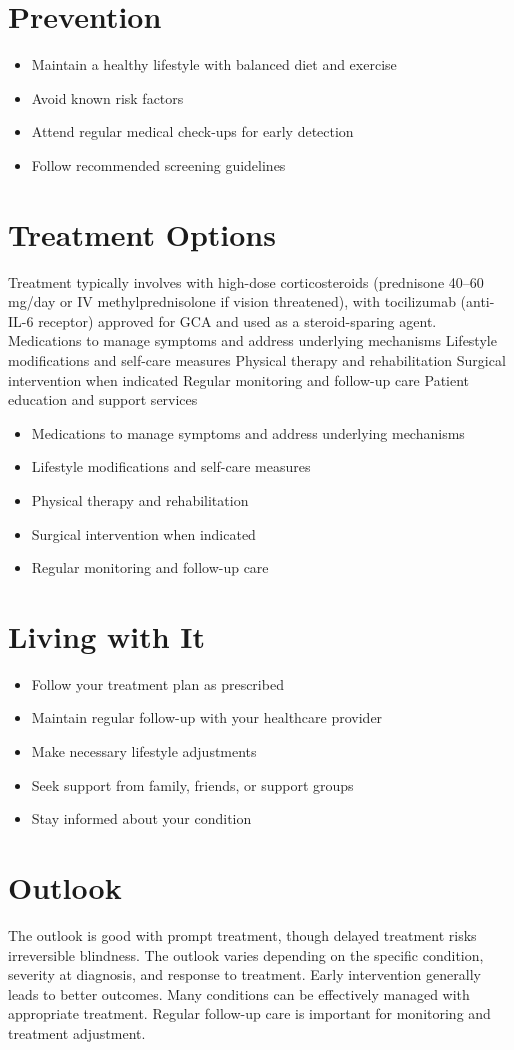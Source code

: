 \section{Prevention}
\begin{itemize}[noitemsep]
  \item Maintain a healthy lifestyle with balanced diet and exercise
  \item Avoid known risk factors
  \item Attend regular medical check-ups for early detection
  \item Follow recommended screening guidelines
\end{itemize}
\section{Treatment Options}
Treatment typically involves with high-dose corticosteroids (prednisone 40--60 mg/day or IV methylprednisolone if vision threatened), with tocilizumab (anti-IL-6 receptor) approved for GCA and used as a steroid-sparing agent. Medications to manage symptoms and address underlying mechanisms Lifestyle modifications and self-care measures Physical therapy and rehabilitation Surgical intervention when indicated Regular monitoring and follow-up care Patient education and support services

\begin{itemize}[noitemsep]
  \item Medications to manage symptoms and address underlying mechanisms
  \item Lifestyle modifications and self-care measures
  \item Physical therapy and rehabilitation
  \item Surgical intervention when indicated
  \item Regular monitoring and follow-up care
\end{itemize}
\section{Living with It}
\begin{itemize}[noitemsep]
  \item Follow your treatment plan as prescribed
  \item Maintain regular follow-up with your healthcare provider
  \item Make necessary lifestyle adjustments
  \item Seek support from family, friends, or support groups
  \item Stay informed about your condition
\end{itemize}
\section{Outlook}
The outlook is good with prompt treatment, though delayed treatment risks irreversible blindness. The outlook varies depending on the specific condition, severity at diagnosis, and response to treatment. Early intervention generally leads to better outcomes. Many conditions can be effectively managed with appropriate treatment. Regular follow-up care is important for monitoring and treatment adjustment.

